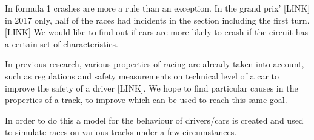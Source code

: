 In formula 1 crashes are more a rule than an exception. In the grand prix' [LINK] in 2017 only, half of the races had incidents in the section including the first turn. [LINK] We would like to find out if cars are more likely to crash if the circuit has a certain set of characteristics.

In previous research, various properties of racing are already taken into account, such as regulations and safety measurements on technical level of a car to improve the safety of a driver [LINK]. We hope to find particular causes in the properties of a track, to improve which can be used to reach this same goal.

In order to do this a model for the behaviour of drivers/cars is created and used to simulate races on various tracks under a few circumstances.
